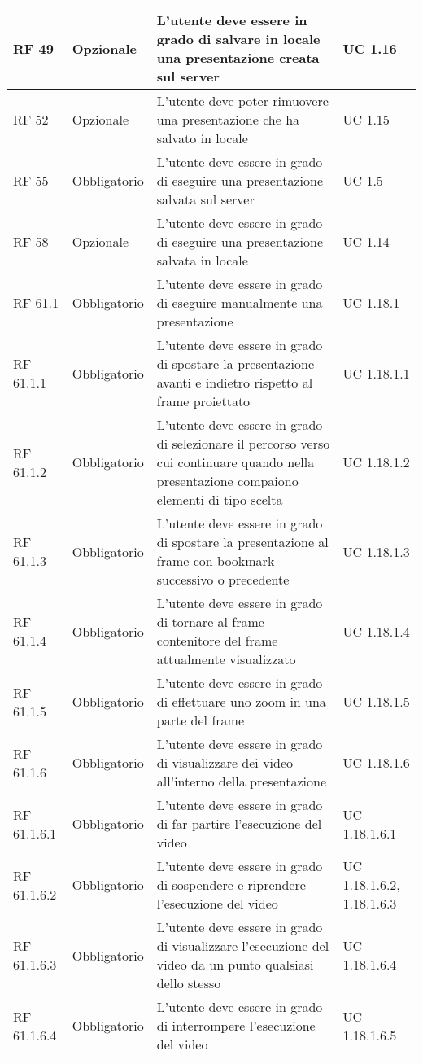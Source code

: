 {\begin{longtable} [c]{| p{2.5cm} | p{2.5cm} | p{6cm} |p{2.5cm}|}
			\hline
			RF 49 & Opzionale & L'utente deve essere in grado di salvare in locale una presentazione creata sul server & UC 1.16\\
			\hline
			RF 52 & Opzionale & L’utente deve poter rimuovere una presentazione che ha salvato in locale & UC 1.15\\
			\hline
			RF 55 & Obbligatorio & L'utente deve essere in grado di eseguire una presentazione salvata sul server & UC 1.5\\
			\hline
			RF 58 & Opzionale & L'utente deve essere in grado di eseguire una presentazione salvata in locale & UC 1.14\\
			\hline
			RF 61.1 & Obbligatorio & L'utente deve essere in grado di eseguire manualmente una presentazione & UC 1.18.1\\
			\hline
			RF 61.1.1 & Obbligatorio & L'utente deve essere in grado di spostare la presentazione avanti e indietro rispetto al frame proiettato & UC 1.18.1.1\\
			\hline
			RF 61.1.2 & Obbligatorio & L'utente deve essere in grado di selezionare il percorso verso cui continuare quando nella presentazione compaiono elementi di tipo scelta & UC 1.18.1.2\\
			\hline
			RF 61.1.3 & Obbligatorio & L'utente deve essere in grado di spostare la presentazione al frame con bookmark successivo o precedente & UC 1.18.1.3\\
			\hline
			RF 61.1.4 & Obbligatorio & L'utente deve essere in grado di tornare al frame contenitore del frame attualmente visualizzato & UC 1.18.1.4\\
			\hline
			RF 61.1.5 & Obbligatorio & L'utente deve essere in grado di effettuare uno zoom in una parte del frame & UC 1.18.1.5\\
			\hline
			RF 61.1.6 & Obbligatorio & L'utente deve essere in grado di visualizzare dei video all'interno della presentazione & UC 1.18.1.6\\
			\hline
			RF 61.1.6.1 & Obbligatorio & L'utente deve essere in grado di far partire l'esecuzione del video & UC 1.18.1.6.1\\
			\hline
			RF 61.1.6.2 & Obbligatorio & L'utente deve essere in grado di sospendere e riprendere l'esecuzione del video & UC 1.18.1.6.2, 1.18.1.6.3\\
			\hline
			RF 61.1.6.3 & Obbligatorio & L'utente deve essere in grado di visualizzare l'esecuzione del video da un punto qualsiasi dello stesso & UC 1.18.1.6.4\\
			\hline
			RF 61.1.6.4 & Obbligatorio & L'utente deve essere in grado di  interrompere l'esecuzione del video & UC 1.18.1.6.5\\

\end{longtable}}
